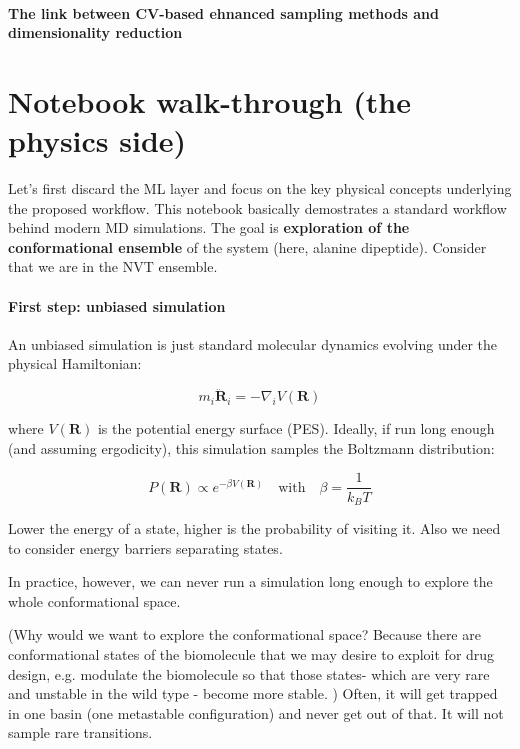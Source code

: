 \paragraph{The link between CV-based ehnanced sampling methods and dimensionality reduction}











\newpage
\section{Notebook walk-through (the physics side)}
Let's first discard the ML layer and focus on the key physical concepts underlying the proposed workflow. This
notebook basically demostrates a standard workflow behind modern MD simulations. The goal is \textbf{exploration of the conformational ensemble} of
the system (here, alanine dipeptide). Consider that we are in the NVT ensemble.


\paragraph{First step: unbiased simulation}
An unbiased simulation is just standard molecular dynamics evolving under the physical Hamiltonian:

$$
m_i \ddot{\mathbf{R}}_i = - \nabla_i V(\mathbf{R})
$$

where $ V(\mathbf{R})$ is the potential energy surface (PES). Ideally, if run long enough (and assuming ergodicity),
this simulation samples the Boltzmann distribution:

$$
P(\mathbf{R}) \propto e^{-\beta V(\mathbf{R})}
\quad \text{with} \quad \beta = \frac{1}{k_B T}
$$

Lower the energy of a state, higher is the probability of visiting it. Also we need to consider energy barriers separating states.

In practice, however, we can never run a simulation long enough to explore the whole conformational space. 

(Why would we want to explore the conformational space?
Because there are conformational states of the biomolecule that we may desire to exploit for drug design, e.g. modulate the biomolecule
so that those states- which are very rare and unstable in the wild type - become more stable. ) Often, it will get trapped in one basin (one metastable configuration) and never get out of that. It will not sample rare transitions.

